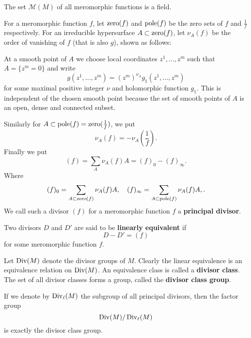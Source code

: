\documentclass[12pt]{article}
\begin{document}
The set \(\mathscr{M}(M)\) of all meromorphic functions is a field.

For a meromorphic function \(f\), let \(\operatorname{zero}(f)\) and \(\operatorname{pole}(f)\) be the
zero sets of \(f\) and \(\frac{1}{f}\) respectively. For an irreducible hypersurface
\(A\subset \operatorname{zero}(f)\), let \(\nu_A(f)\) be the order of vanishing of \(f\)
(that is also \(g\)), shown as follows:

At a smooth point of \(A\) we choose local coordinates \(z^1,\ldots,z^m\) such that
\(A=\{z^m=0\}\) and write \[
  g(z^1,\ldots,z^m)=(z^m)^{\nu_A} g_1(z^1,\ldots,z^m)
\] for some maximal positive integer \(\nu\) and holomorphic function \(g_1\).
This is independent of the chosen smooth point because the set of smooth points of
\(A\) is an open, dense and connected subset.

Similarly for \(A\subset \operatorname{pole}(f)=\operatorname{zero}(\frac{1}{f})\), we put \[
  \nu_A(f)=-\nu_A(\frac{1}{f})
.\] Finally we put \[
  (f)=\sum_A \nu_A(f)A=(f)_0-(f)_\infty
.\] Where \[
  (f)_0=\sum_{A\subset\operatorname{zero}(f)}\nu_A(f)A,\quad
  (f)_\infty=\sum_{A\subset\operatorname{pole}(f)}\nu_A(f)A,
.\] We call such a divisor \((f)\) for a meromorphic function \(f\) a \textbf{principal
divisor}.

Two divisors \(D\) and \(D'\) are said to be \textbf{linearly equivalent} if \[
  D-D'=(f)
\] for some meromorphic function \(f\).

Let \(\operatorname{Div}(M)\) denote the divisor groups of \(M\). Clearly the linear equivalence
is an equivalence relation on \(\operatorname{Div}(M)\). An equivalence class is called a
\textbf{divisor class}. The set of all divisor classes forms a group, called the
\textbf{divisor class group}.

If we denote by \(\operatorname{Div}_\ell(M)\) the subgroup of all principal divisors, then
the factor group \[
  \operatorname{Div}(M)/\operatorname{Div}_\ell(M)
\] is exactly the divisor class group.
\end{document}
